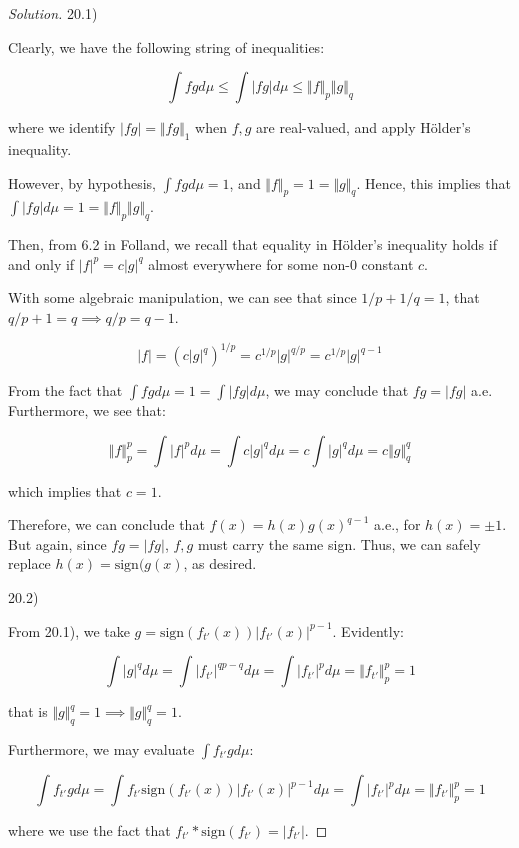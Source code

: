 \documentclass[10pt]{article}
\begin{document}
\begin{proof}[Solution]

20.1)

Clearly, we have the following string of inequalities:

$$ \int fg d\mu \leq \int |fg| d\mu \leq \Vert f \Vert_p \Vert g\Vert_q $$

where we identify $|fg| = \Vert fg\Vert_1$ when $f, g$ are real-valued, and apply H\"older's inequality.

However, by hypothesis, $\int fg d\mu = 1$, and $\Vert f \Vert_p = 1 = \Vert g \Vert_q$. Hence, this implies that $\int |fg| d\mu = 1 = \Vert f\Vert_p \Vert g \Vert_q$.

Then, from 6.2 in Folland, we recall that equality in H\"older's inequality holds if and only if $|f|^p  = c |g|^q$ almost everywhere for some non-0 constant $c$.

With some algebraic manipulation, we can see that since $1/p + 1/q = 1$, that $q/p + 1 = q \implies q/p = q-1$.

$$ |f| = ( c |g|^q)^{1/p} = c^{1/p} |g|^{q/p} = c^{1/p} |g|^{q - 1}$$

From the fact that $\int fg d\mu = 1 = \int |fg| d\mu $, we may conclude that $fg = |fg|$ a.e. Furthermore, we see that:

$$ \Vert f \Vert_p^p = \int |f|^p d\mu = \int c |g|^q d\mu = c \int |g|^q d\mu = c \Vert g \Vert_q^q $$

which implies that $c = 1$.

Therefore, we can conclude that $f(x) =h(x) g(x)^{q-1}$ a.e., for $h(x) = \pm 1$. But again, since $fg = |fg|$, $f,g$ must carry the same sign. Thus, we can safely replace $h(x) = \text{sign}{(g(x)}$, as desired.

20.2)

From 20.1), we take $g =  \text{sign}(f_{t'}(x)) | f_{t'}(x)|^{p-1}$. Evidently:

$$ \int |g|^q d\mu = \int |f_{t'}|^{qp - q} d\mu  =  \int |f_{t'}|^p d\mu = \Vert f_{t'} \Vert_p^p = 1 $$

that is $\Vert g \Vert_q^q = 1 \implies \Vert g \Vert_q^q = 1$.

Furthermore, we may evaluate $\int f_{t'}g d\mu$:

$$ \int f_{t'}g d\mu = \int f_{t'} \text{sign}(f_{t'}(x)) | f_{t'}(x)|^{p-1} d\mu = \int |f_{t'}|^p d\mu = \Vert f_{t'}\Vert_p^p = 1$$

where we use the fact that $f_{t'} * \text{sign}(f_{t'}) = |f_{t'}|$.


\end{proof}
\end{document}
